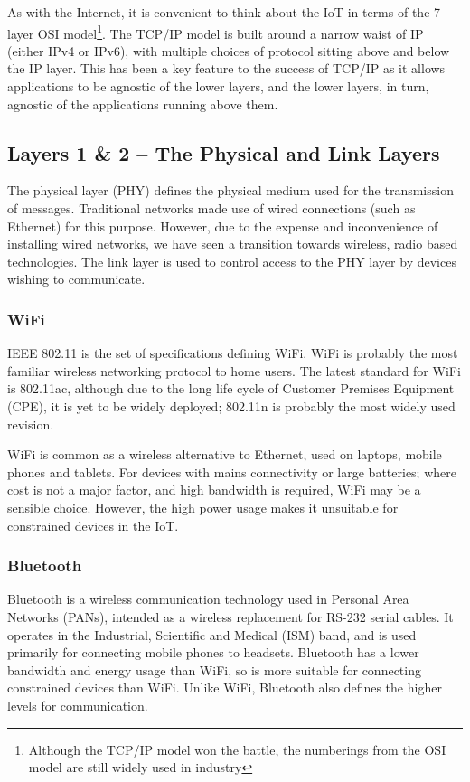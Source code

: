 \documentclass[10pt,journal,compsoc]{IEEEtran}
\begin{document}
As with the Internet, it is convenient to think about the IoT in terms of the 7
layer OSI model\footnote{Although the TCP/IP model won the battle, the
numberings from the OSI model are still widely used in industry}.  The TCP/IP
model is built around a narrow waist of IP (either IPv4 or IPv6), with multiple
choices of protocol sitting above and below the IP layer. This has been a key
feature to the success of TCP/IP as it allows applications to be agnostic of
the lower layers, and the lower layers, in turn, agnostic of the applications
running above them. 

\subsection{Layers 1 \& 2 -- The Physical and Link Layers}
\label{layer_1_2}
The physical layer (PHY) defines the physical medium used for the transmission
of messages. Traditional networks made use of wired connections (such as
Ethernet) for this purpose. However, due to the expense and inconvenience of
installing wired networks, we have seen a transition towards wireless, radio
based technologies. The link layer is used to control access to the PHY layer
by devices wishing to communicate.

\subsubsection{WiFi}
IEEE 802.11 is the set of specifications defining WiFi. WiFi is probably the
most familiar wireless networking protocol to home users. The latest standard
for WiFi is 802.11ac, although due to the long life cycle of Customer Premises
Equipment (CPE), it is yet to be widely deployed; 802.11n is probably the
most widely used revision. 

WiFi is common as a wireless alternative to Ethernet, used on laptops, mobile
phones and tablets. For devices with mains connectivity or large batteries;
where cost is not a major factor, and high bandwidth is required, WiFi may be a
sensible choice. However, the high power usage makes it unsuitable for
constrained devices in the IoT.

\subsubsection{Bluetooth}
Bluetooth is a wireless communication technology used in Personal Area Networks
(PANs), intended as a wireless replacement for RS-232 serial cables. It
operates in the Industrial, Scientific and Medical (ISM) band, and is used
primarily for connecting mobile phones to headsets. Bluetooth has a lower
bandwidth and energy usage than WiFi, so is more suitable for connecting
constrained devices than WiFi. Unlike WiFi, Bluetooth also defines the higher
levels for communication. 
\end{document}
